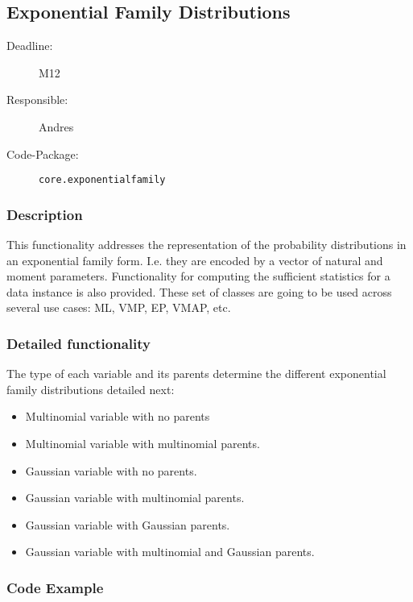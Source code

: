 \newpage
\subsection{Exponential Family Distributions}
\label{Functionality:ID}

\begin{description}
\item[Deadline:] M12
\item[Responsible:] Andres
\item[Code-Package:] \texttt{core.exponentialfamily}
\end{description}

\subsubsection*{Description}

This functionality addresses the representation of the probability distributions in an exponential family form. I.e. they are encoded by a vector of natural and moment parameters. Functionality for computing the sufficient statistics for a data instance is also provided. These set of classes are going to be used across several use cases:  ML, VMP, EP, VMAP, etc. 

\subsubsection*{Detailed functionality}

The type of each variable and its parents determine the different exponential family distributions detailed next:

\begin{itemize}
\item Multinomial variable with no parents
\item Multinomial variable with multinomial parents.
\item Gaussian variable with no parents.
\item Gaussian variable with multinomial parents.
\item Gaussian variable with Gaussian parents. 
\item Gaussian variable with multinomial and Gaussian parents. 

\end{itemize}


\subsubsection*{Code Example}
